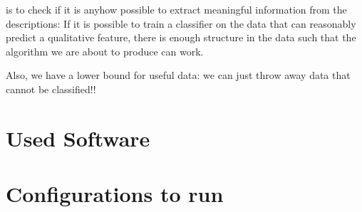 is to check if it is anyhow possible to extract meaningful information from the descriptions: If it is possible to train a classifier on the data that can reasonably predict a qualitative feature, there is enough structure in the data such that the algorithm we are about to produce can work. 

Also, we have a lower bound for useful data: we can just throw away data that cannot be classified!!


\section{Used Software}



\section{Configurations to run \mainalgos}
\label{ap:yamls_for_origalgos}

